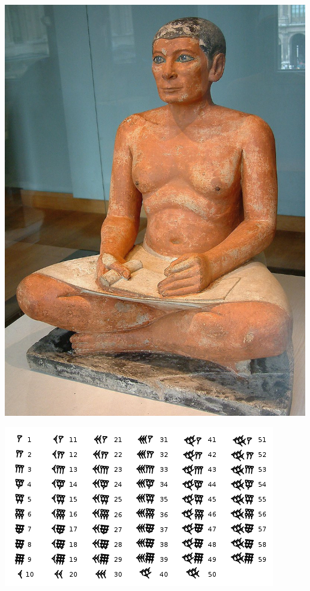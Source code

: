 \begin{multicols}{2}
	\vfill
\columnbreak
\begin{center}
	\includegraphics[height=\textheight]{./IMG/Egypte_louvre_285_scribe.jpg}
\end{center}

\end{multicols}

\vfill
\pagebreak

	\begin{center}
	\includegraphics[height=\textheight]{./IMG/Babylonian_numerals.svg.png}
\end{center}

\vfill
\pagebreak